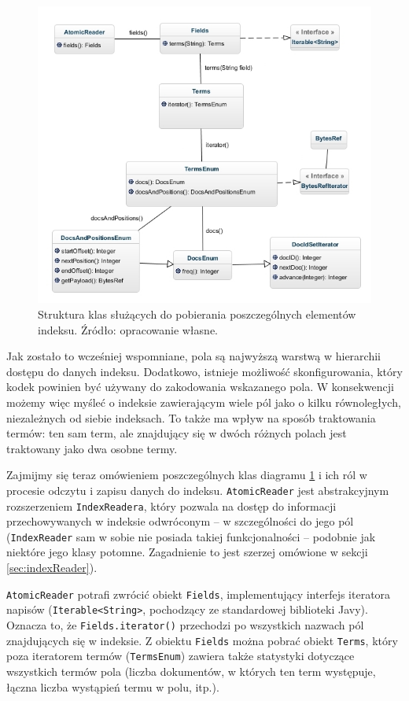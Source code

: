 \begin{figure}[here]
 \includegraphics[scale=0.64]{pictures/LuceneAccessAPI_1.jpg}
 \caption{Struktura klas służących do pobierania poszczególnych elementów indeksu. Źródło: opracowanie własne.\label{fig:indexApi}}
\end{figure}

Jak zostało to wcześniej wspomniane, pola są najwyższą warstwą w hierarchii dostępu do danych indeksu. Dodatkowo, istnieje możliwość skonfigurowania, który kodek powinien być używany do zakodowania wskazanego pola. W konsekwencji możemy więc myśleć o indeksie zawierającym wiele pól jako o kilku równoległych, niezależnych od siebie indeksach. To także ma wpływ na sposób traktowania termów: ten sam term, ale znajdujący się w dwóch różnych polach jest traktowany jako dwa osobne termy. 

Zajmijmy się teraz omówieniem poszczególnych klas diagramu \ref{fig:indexApi} i ich ról w procesie odczytu i zapisu danych do indeksu. \texttt{AtomicReader} jest abstrakcyjnym rozszerzeniem \texttt{IndexReadera}, który pozwala na dostęp do informacji przechowywanych w indeksie odwróconym -- w szczególności do jego pól (\texttt{IndexReader} sam w sobie nie posiada takiej funkcjonalności -- podobnie jak niektóre jego klasy potomne. Zagadnienie to jest szerzej omówione w sekcji \ref{sec:indexReader}). 

\texttt{AtomicReader} potrafi zwrócić obiekt \texttt{Fields}, implementujący interfejs iteratora napisów (\texttt{Iterable<String>}, pochodzący ze standardowej biblioteki Javy). Oznacza to, że \texttt{Fields.iterator()} przechodzi po wszystkich nazwach pól znajdujących się w indeksie. Z obiektu \texttt{Fields} można pobrać obiekt \texttt{Terms}, który poza iteratorem termów (\texttt{TermsEnum}) zawiera także statystyki dotyczące wszystkich termów pola (liczba dokumentów, w których ten term występuje, łączna liczba wystąpień termu w polu, itp.).

